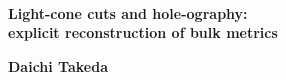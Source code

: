 \documentclass[12pt]{article}
\date{}
\renewcommand{\thefootnote}{\fnsymbol{footnote}}
\begin{document}
{\Large{}\\[2mm]
\textbf{Light-cone cuts and hole-ography:\\explicit reconstruction of bulk metrics
\cite{Takeda:2021dsl}
}
}

\noindent
\hfill
\textbf{Daichi Takeda}%

\renewcommand{\thefootnote}{\arabic{footnote})}
\setcounter{footnote}{0}
\vspace{12pt}


 

\end{document}
